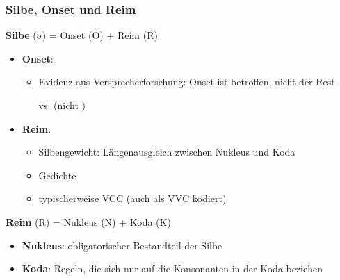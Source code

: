 \begin{frame}
\frametitle{Silbe, Onset und Reim}

\textbf{Silbe} ($\sigma$) = Onset (O) + Reim (R)

\begin{itemize}
\item \textbf{Onset}: 

	\begin{itemize}
		\item Evidenz aus Versprecherforschung: Onset ist betroffen, nicht der Rest
		
		\ea
		 vs.  (nicht )
		\z
	\end{itemize}	

\pause 

\item \textbf{Reim}: 
	\begin{itemize}
		\item Silbengewicht: Längenausgleich zwischen Nukleus und Koda 		
		
		
		\item Gedichte
		\item typischerweise VCC (auch als VVC kodiert)
	\end{itemize}

\end{itemize}

\textbf{Reim} (R) = Nukleus (N) + Koda (K)

	\begin{itemize}
		\item \textbf{Nukleus}: obligatorischer Bestandteil der Silbe
		
		\item \textbf{Koda}: Regeln, die sich nur auf die Konsonanten in der Koda beziehen
	\end{itemize}

\end{frame}


